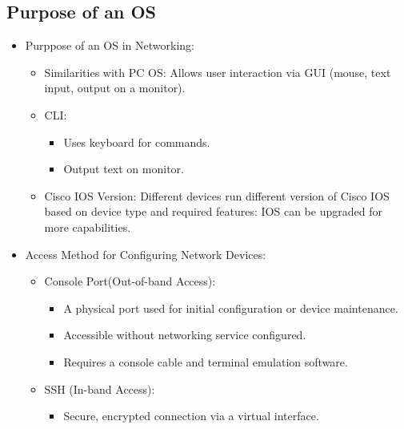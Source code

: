 \documentclass[a4paper,11pt]{article}
\begin{document}
\subsection{Purpose of an OS}
\begin{itemize}
    \item Purppose of an OS in Networking:\\
    \begin{itemize}
        \item Similarities with PC OS: Allows user interaction via GUI (mouse, text input, output on a monitor).\\
        \item CLI:\\
        \begin{itemize}
            \item Uses keyboard for commands.\\
            \item Output text on monitor.\\
        \end{itemize}
    \item Cisco IOS Version: Different devices run different version of Cisco IOS based on device type and required features: IOS can be upgraded for more capabilities.\\
    \end{itemize}
    \item Access Method for Configuring Network Devices:\\
    \begin{itemize}
        \item Console Port(Out-of-band Access):\\
        \begin{itemize}
            \item A physical port used for initial configuration or device maintenance.\\
            \item Accessible without networking service configured.
            \item Requires a console cable and terminal emulation software.\\
        \end{itemize}
        \item SSH (In-band Access):\\
        \begin{itemize}
            \item Secure, encrypted connection via a virtual interface.\\

\end{itemize}
\end{itemize}
\end{itemize}
\end{document}
